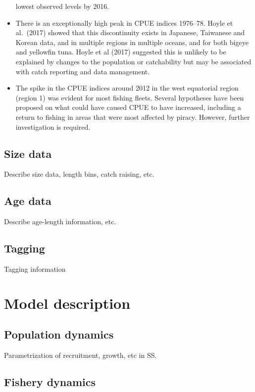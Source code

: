 \documentclass[
]{scrartcl}
\begin{document}
\begin{itemize}
  lowest observed levels by 2016.
\item
  There is an exceptionally high peak in CPUE indices 1976--78. Hoyle et
  al.~(2017) showed that this discontinuity exists in Japanese,
  Taiwanese and Korean data, and in multiple regions in multiple oceans,
  and for both bigeye and yellowfin tuna. Hoyle et al (2017) suggested
  this is unlikely to be explained by changes to the population or
  catchability but may be associated with catch reporting and data
  management.
\item
  The spike in the CPUE indices around 2012 in the west equatorial
  region (region 1) was evident for most fishing fleets. Several
  hypotheses have been proposed on what could have caused CPUE to have
  increased, including a return to fishing in areas that were most
  affected by piracy. However, further investigation is required.
\end{itemize}

\subsection{Size data}\label{size-data}

Describe size data, length bins, catch raising, etc.

\subsection{Age data}\label{age-data}

Describe age-length information, etc.

\subsection{Tagging}\label{tagging}

Tagging information

\section{Model description}\label{model-description}

\subsection{Population dynamics}\label{population-dynamics}

Parametrization of recruitment, growth, etc in SS.

\subsection{Fishery dynamics}\label{fishery-dynamics}
\end{document}
